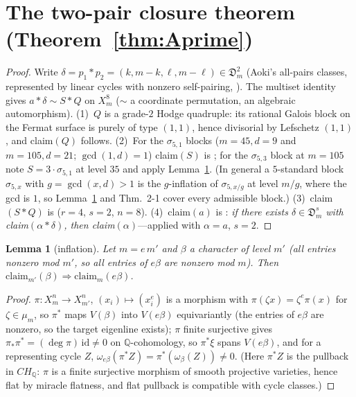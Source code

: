 \documentclass[11pt]{amsart}
\newtheorem{lemma}[theorem]{Lemma}
\theoremstyle{remark}
\newcommand{\Q}{\mathbb{Q}}
\newcommand{\Ds}{\mathfrak{D}}
\newcommand{\V}{V}
\newcommand{\zt}{\zeta}
\begin{document}
\section{The two-pair closure theorem (Theorem~\ref{thm:Aprime})}\label{sec:Aprime}
\begin{proof}
Write $\delta=p_1*p_2=(k,m-k,\ell,m-\ell)\in\Ds^2_m$ (Aoki's all-pairs classes, represented by linear
cycles with nonzero self-pairing, \cite[Thm.~1-1]{Aoki87}). The multiset identity gives $a*\delta\sim S*Q$
on $X^8_m$ ($\sim$ a coordinate permutation, an algebraic automorphism).
(1)~$Q$ is a grade-$2$ Hodge quadruple: its rational Galois block on the Fermat surface is
purely of type $(1,1)$, hence divisorial by Lefschetz $(1,1)$, and claim$(Q)$ follows.
(2)~For the $\sigma_{5,1}$ blocks ($m=45,d=9$ and $m=105,d=21$; $\gcd(1,d)=1$) claim$(S)$ is
\cite[Thm.~2-1]{Aoki87}; for the $\sigma_{5,3}$ block at $m=105$ note $S=3\cdot\sigma_{5,1}$ at level $35$
and apply Lemma~\ref{lem:infl}. (In general a $5$-standard block $\sigma_{5,x}$ with
$g=\gcd(x,d)>1$ is the $g$-inflation of $\sigma_{5,x/g}$ at level $m/g$, where the gcd is $1$, so
Lemma~\ref{lem:infl} and Thm.~2-1 cover every admissible block.)
(3)~claim$(S*Q)$ is \cite[Thm.~1-4(i)]{Aoki87} ($r=4$, $s=2$, $n=8$).
(4)~claim$(a)$ is \cite[Thm.~1-4(ii)]{Aoki87}: \emph{if there exists $\delta\in\Ds^s_m$ with
claim$(\alpha*\delta)$, then claim$(\alpha)$}---applied with $\alpha=a$, $s=2$.
\end{proof}
\begin{lemma}[inflation]\label{lem:infl}
Let $m=e\,m'$ and $\beta$ a character of level $m'$ (all entries nonzero mod $m'$, so all
entries of $e\beta$ are nonzero mod $m$). Then
$\mathrm{claim}_{m'}(\beta)\Rightarrow\mathrm{claim}_m(e\beta)$.
\end{lemma}
\begin{proof}
$\pi\colon X^n_m\to X^n_{m'}$, $(x_i)\mapsto(x_i^e)$ is a morphism with $\pi(\zt x)=\zt^e\pi(x)$ for
$\zt\in\mu_m$, so $\pi^*$ maps $\V(\beta)$ into $\V(e\beta)$ equivariantly (the entries of $e\beta$ are nonzero, so the target eigenline exists); $\pi$ finite surjective gives
$\pi_*\pi^*=(\deg\pi)\,\mathrm{id}\neq0$ on $\Q$-cohomology, so $\pi^*\xi$ spans $\V(e\beta)$, and for a
representing cycle $Z$, $\omega_{e\beta}(\pi^*Z)=\pi^*(\omega_\beta(Z))\neq0$. (Here $\pi^*Z$
is the pullback in $CH_\Q$: $\pi$ is a finite surjective morphism of smooth projective
varieties, hence flat by miracle flatness, and flat pullback is compatible with cycle classes.)
\end{proof}
\end{document}
